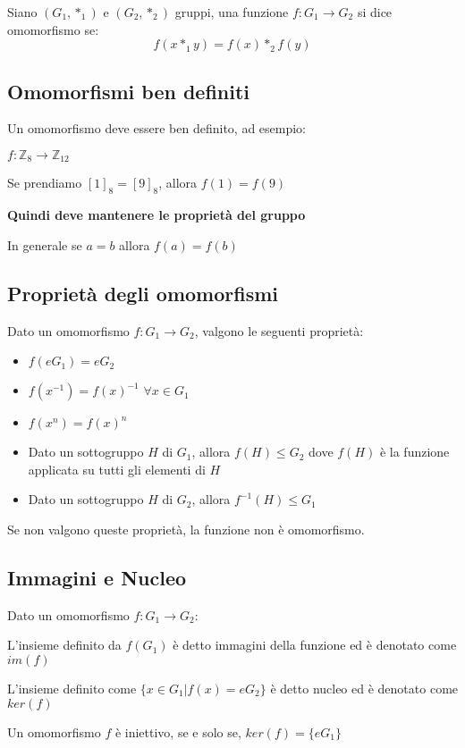 \documentclass[a4paper, 10pt]{article}
\begin{document}
Siano $(G_1, *_1)$ e $(G_2, *_2)$ gruppi, una funzione $f: G_1 \rightarrow G_2$ si dice omomorfismo se:$$f(x *_1 y) = f(x) *_2 f(y)$$

\subsection{Omomorfismi ben definiti}

Un omomorfismo deve essere ben definito, ad esempio:

$f: \mathbb{Z}_8 \rightarrow \mathbb{Z}_{12}$

Se prendiamo $[1]_8 = [9]_8$, allora $f(1) = f(9)$ 

\textbf{Quindi deve mantenere le proprietà del gruppo}

In generale se $a = b$ allora $f(a) = f(b)$

\subsection{Proprietà degli omomorfismi}

Dato un omomorfismo $f: G_1 \rightarrow G_2$, valgono le seguenti proprietà:

\begin{itemize}
	\item $f(eG_1) = eG_2$
	\item $f(x^{-1}) = f(x)^{-1}$ $\forall x \in G_1$
	\item $f(x^n) = f(x)^n$
	\item Dato un sottogruppo $H$ di $G_1$, allora $f(H) \leq G_2$ dove $f(H)$ è la funzione applicata su tutti gli elementi di $H$
	\item Dato un sottogruppo $H$ di $G_2$, allora $f^{-1}(H) \leq G_1$
\end{itemize}

Se non valgono queste proprietà, la funzione non è omomorfismo.

\subsection{Immagini e Nucleo}

Dato un omomorfismo $f: G_1 \rightarrow G_2$:

L'insieme definito da $f(G_1)$ è detto immagini della funzione ed è denotato come $im(f)$

L'insieme definito come $\{x \in G_1 | f(x) = eG_2\}$ è detto nucleo ed è denotato come $ker(f)$

Un omomorfismo $f$ è iniettivo, se e solo se, $ker(f) = \{eG_1\}$
\end{document}
